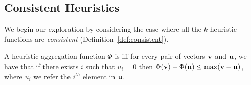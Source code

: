 \subsection{Consistent Heuristics}

We begin our exploration by considering the case where all the $k$ heuristic functions are \emph{consistent} (Definition~\ref{def:consistent}). 


\begin{definition}
A heuristic aggregation function $\Phi$ is \emph{\axiomcons} iff for every pair of vectors $\mathbf{v}$ and $\mathbf{u}$, we have that if there exists $i$ such that  $u_i = 0$ then $\Phi(\mathbf{v}) - \Phi(\mathbf{u}) \leq \max (\mathbf{v}-\mathbf{u})$, where $u_i$ we refer the $i^{th}$ element in $\mathbf{u}$.
\end{definition} 

